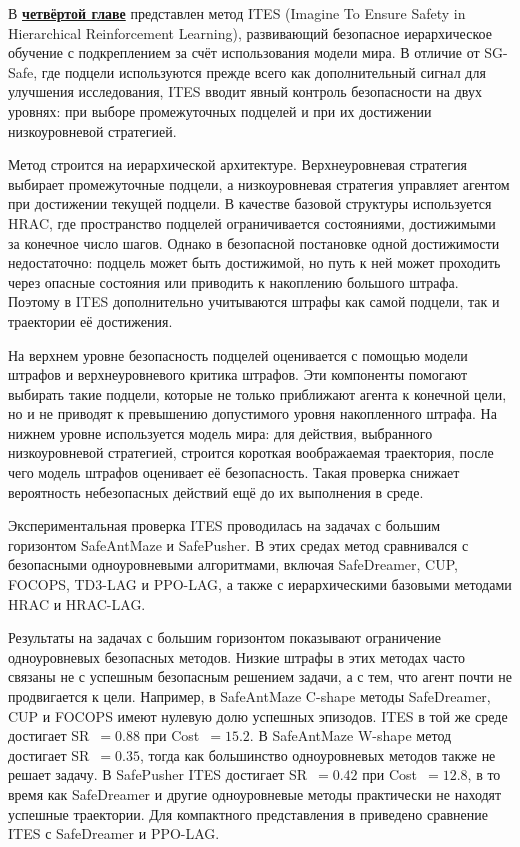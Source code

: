 В \underline{\textbf{четвёртой главе}} представлен метод ITES (Imagine To Ensure Safety in Hierarchical Reinforcement Learning), развивающий безопасное иерархическое обучение с подкреплением за счёт использования модели мира. В отличие от SG-Safe, где подцели используются прежде всего как дополнительный сигнал для улучшения исследования, ITES вводит явный контроль безопасности на двух уровнях: при выборе промежуточных подцелей и при их достижении низкоуровневой стратегией.

Метод строится на иерархической архитектуре. Верхнеуровневая стратегия выбирает промежуточные подцели, а низкоуровневая стратегия управляет агентом при достижении текущей подцели. В качестве базовой структуры используется HRAC, где пространство подцелей ограничивается состояниями, достижимыми за конечное число шагов. Однако в безопасной постановке одной достижимости недостаточно: подцель может быть достижимой, но путь к ней может проходить через опасные состояния или приводить к накоплению большого штрафа. Поэтому в ITES дополнительно учитываются штрафы как самой подцели, так и траектории её достижения.

На верхнем уровне безопасность подцелей оценивается с помощью модели штрафов и верхнеуровневого критика штрафов. Эти компоненты помогают выбирать такие подцели, которые не только приближают агента к конечной цели, но и не приводят к превышению допустимого уровня накопленного штрафа. На нижнем уровне используется модель мира: для действия, выбранного низкоуровневой стратегией, строится короткая воображаемая траектория, после чего модель штрафов оценивает её безопасность. Такая проверка снижает вероятность небезопасных действий ещё до их выполнения в среде.

Экспериментальная проверка ITES проводилась на задачах с большим горизонтом SafeAntMaze и SafePusher. В этих средах метод сравнивался с безопасными одноуровневыми алгоритмами, включая SafeDreamer, CUP, FOCOPS, TD3-LAG и PPO-LAG, а также с иерархическими базовыми методами HRAC и HRAC-LAG.

Результаты на задачах с большим горизонтом показывают ограничение одноуровневых безопасных методов. Низкие штрафы в этих методах часто связаны не с успешным безопасным решением задачи, а с тем, что агент почти не продвигается к цели. Например, в SafeAntMaze C-shape методы SafeDreamer, CUP и FOCOPS имеют нулевую долю успешных эпизодов. ITES в той же среде достигает SR~$= 0.88$ при Cost~$= 15.2$. В SafeAntMaze W-shape метод достигает SR~$= 0.35$, тогда как большинство одноуровневых методов также не решает задачу. В SafePusher ITES достигает SR~$= 0.42$ при Cost~$= 12.8$, в то время как SafeDreamer и другие одноуровневые методы практически не находят успешные траектории. Для компактного представления в  приведено сравнение ITES с SafeDreamer и PPO-LAG.

